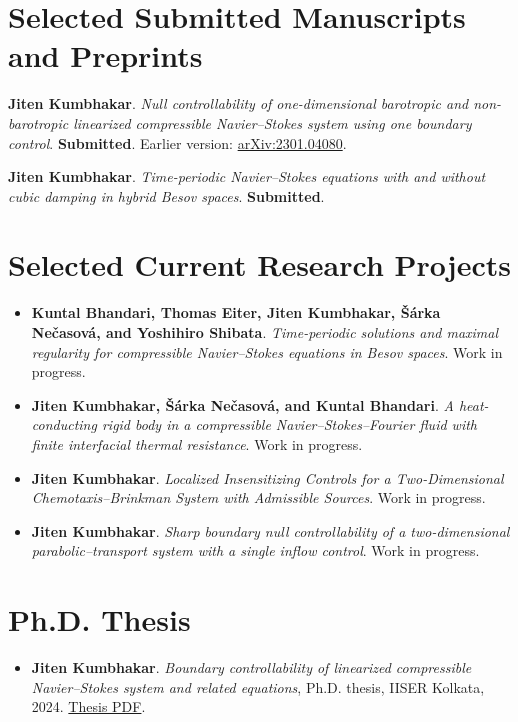 \documentclass[10pt,a4paper]{article}
\begin{document}
\section*{Selected Submitted Manuscripts and Preprints}
\begin{enumerate}[leftmargin=2em,label={\textbf{[S\arabic*]}}]
    \item \textbf{Jiten Kumbhakar}. \emph{Null controllability of one-dimensional barotropic and non-barotropic linearized compressible Navier--Stokes system using one boundary control}. \textbf{Submitted}. Earlier version: \href{https://arxiv.org/abs/2301.04080}{arXiv:2301.04080}.
    \item \textbf{Jiten Kumbhakar}. \emph{Time-periodic Navier--Stokes equations with and without cubic damping in hybrid Besov spaces}. \textbf{Submitted}.
\end{enumerate}

\section*{Selected Current Research Projects}
\begin{itemize}
    \item \textbf{Kuntal Bhandari, Thomas Eiter, Jiten Kumbhakar, \v{S}\'arka Ne\v{c}asov\'a, and Yoshihiro Shibata}. \emph{Time-periodic solutions and maximal regularity for compressible Navier--Stokes equations in Besov spaces}. Work in progress.
    \item \textbf{Jiten Kumbhakar, \v{S}\'arka Ne\v{c}asov\'a, and Kuntal Bhandari}. \emph{A heat-conducting rigid body in a compressible Navier--Stokes--Fourier fluid with finite interfacial thermal resistance}. Work in progress.
    \item \textbf{Jiten Kumbhakar}. \emph{Localized Insensitizing Controls for a Two-Dimensional Chemotaxis--Brinkman System with Admissible Sources}. Work in progress.
    \item \textbf{Jiten Kumbhakar}. \emph{Sharp boundary null controllability of a two-dimensional parabolic--transport system with a single inflow control}. Work in progress.
\end{itemize}

\section*{Ph.D. Thesis}
\begin{itemize}
    \item \textbf{Jiten Kumbhakar}. \emph{Boundary controllability of linearized compressible Navier--Stokes system and related equations}, Ph.D. thesis, IISER Kolkata, 2024. \href{https://kumbhakarjiten.github.io/Thesis_Jiten_Kumbhakar.pdf}{Thesis PDF}.
\end{itemize}
\end{document}
